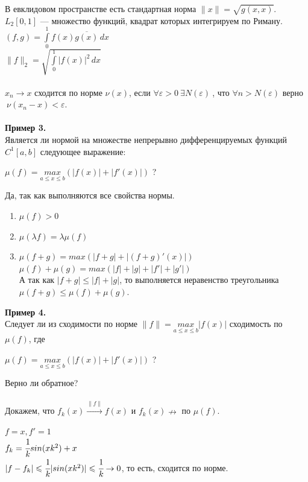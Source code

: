 \documentclass[a4paper,12pt]{article}
\begin{document}
\begin{defintion}
В евклидовом пространстве есть стандартная норма $\parallel x \parallel = \sqrt{g(x, x)}$.\\
$L_2[0, 1]$ --- множество функций, квадрат которых интегрируем по Риману.\\
$(f, g) = \int\limits_0^1 f(x) \overline{g(x)}\,dx$\\
$\parallel f \parallel_2 = \sqrt{\int\limits_0^1 |f(x)|^2\,dx}$\\
\\
$x_n \to x$ $\textbf{сходится по норме}$ $\nu(x)$, если $\forall \varepsilon > 0 ~ \exists N(\varepsilon)~$, что $\forall n > N(\varepsilon)$ верно $~\nu(x_n - x) < \varepsilon$.\\ \\
\textbf{Пример 3.}\\
Является ли нормой на множестве непрерывно дифференцируемых функций $C^1[a, b]$ следующее выражение: \begin{center}$\mu(f) = \underset{a \leqslant x \leqslant b}{max}(|f(x)|+|f'(x)|)$ ?\end{center}
Да, так как выполняются все свойства нормы.\begin{enumerate}
	\item $\mu(f) > 0$
	\item $\mu(\lambda f) = \lambda \mu(f)$
	\item $\mu(f+g) = max(|f+g|+|(f+g)'(x)|)$\\
	$\mu(f)+\mu(g) = max(|f|+|g|+|f'|+|g'|)$\\
	А так как $|f+g|\leqslant |f|+|g|$, то выполняется неравенство треугольника \\$\mu(f+g) \leqslant \mu(f) + \mu(g)$.\end{enumerate}
\textbf{Пример 4.}\\ Следует ли из сходимости по норме $\parallel f \parallel = \underset{a \leqslant x \leqslant b}{max} |f(x)|$ сходимость по $\mu(f)$, где \begin{center}$\mu(f) = \underset{a \leqslant x \leqslant b}{max}(|f(x)|+|f'(x)|)$ ?\end{center} Верно ли обратное?\\ \\
Докажем, что $f_k(x) \overset{\parallel f \parallel}{\rightarrow} f(x)$ и $f_k(x) \nrightarrow$ по $\mu(f)$.
\begin{center}
	$f = x, f' = 1$\\
	$f_k = \cfrac{1}{k}sin(xk^2)+x$\\
	$|f-f_k| \leqslant \cfrac{1}{k} |sin(xk^2)| \leqslant \cfrac{1}{k} \to 0$, то есть, сходится по норме.\\

\end{center}
\end{defintion}
\end{document}
